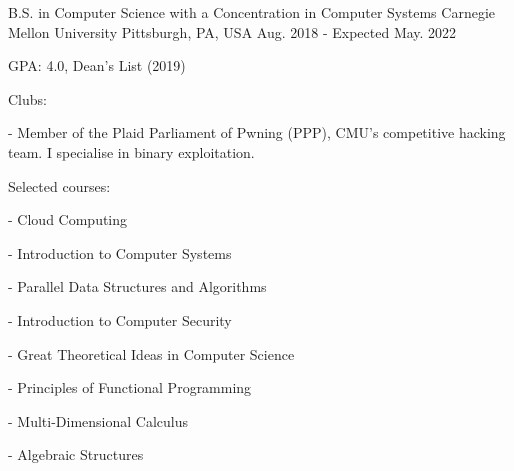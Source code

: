 

\begin{cventries}

  \cventry
    {B.S. in Computer Science with a Concentration in Computer Systems} %
    {Carnegie Mellon University} %
    {Pittsburgh, PA, USA} %
    {Aug. 2018 - Expected May. 2022} %
    {
      \begin{cvitems} %
      \item {GPA: 4.0, Dean's List (2019)}
      \item {Clubs:}
      \item[-] {Member of the Plaid Parliament of Pwning (PPP), CMU's competitive hacking team. I specialise in binary exploitation.}
      \item {Selected courses:}
        \setlength\multicolsep{0pt}
        \begin{multicols}{3}
          \item[-] {Cloud Computing}
          \item[-] {Introduction to Computer Systems}
          \item[-] {Parallel Data Structures and Algorithms}
          \item[-] {Introduction to Computer Security}
          \item[-] {Great Theoretical Ideas in Computer Science}
          \item[-] {Principles of Functional Programming}
          \item[-] {Multi-Dimensional Calculus}
          \item[-] {Algebraic Structures}
        \end{multicols}
      \end{cvitems}
    }
\end{cventries}
